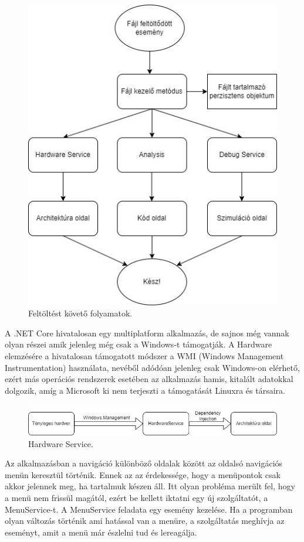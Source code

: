 \begin{figure}[h]
\centering
\includegraphics[scale=0.5]{images/UploadFlow.jpg}
\caption{Feltöltést követő folyamatok.}
\label{fig:up}
\end{figure}

A .NET Core hivatalosan egy multiplatform alkalmazás, de sajnos még vannak olyan részei amik jelenleg még csak a Windows-t támogatják. A Hardware elemzésére a hivatalosan támogatott módszer a WMI (Windows Management Instrumentation) használata, nevéből adódóan jelenleg csak Windows-on elérhető, ezért más operációs rendszerek esetében az alkalmazás hamis, kitalált adatokkal dolgozik, amíg a Microsoft ki nem terjeszti a támogatását Linuxra és társaira.

\begin{figure}[h]
\centering
\includegraphics[scale=0.5]{images/HWS.jpg}
\caption{Hardware Service.}
\label{fig:hws}
\end{figure}

\newpage

Az alkalmazásban a navigáció különböző oldalak között az oldalsó navigációs menün keresztül történik. Ennek az az érdekessége, hogy a menüpontok csak akkor jelennek meg, ha tartalmuk készen áll. Itt olyan probléma merült fel, hogy a menü nem frissül magától, ezért be kellett iktatni egy új szolgáltatót, a MenuService-t. A MenuService feladata egy esemény kezelése. Ha a programban olyan változás történik ami hatással van a menüre, a szolgáltatás meghívja az eseményt, amit a menü már észlelni tud és lereagálja. 

